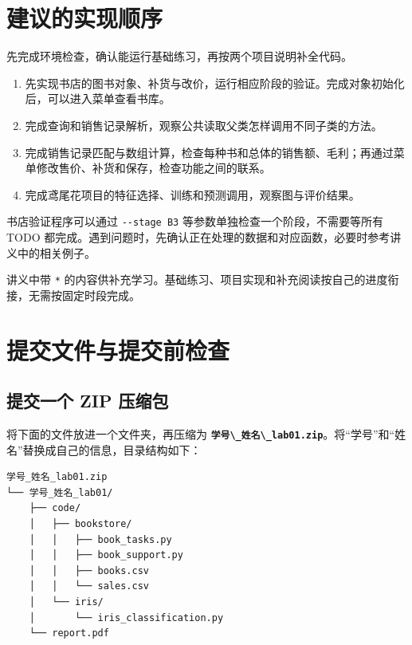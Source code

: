 \documentclass[UTF8,a4paper,11pt,fontset=fandol]{ctexart}
\providecommand{\tightlist}{\setlength{\itemsep}{0pt}\setlength{\parskip}{0pt}}
\providecommand{\passthrough}[1]{#1}
\begin{document}
\section{建议的实现顺序}\label{ux5efaux8baeux7684ux5b9eux73b0ux987aux5e8f}

先完成环境检查，确认能运行基础练习，再按两个项目说明补全代码。

\begin{enumerate}
\def\labelenumi{\arabic{enumi}.}
\tightlist
\item
  先实现书店的图书对象、补货与改价，运行相应阶段的验证。完成对象初始化后，可以进入菜单查看书库。
\item
  完成查询和销售记录解析，观察公共读取父类怎样调用不同子类的方法。
\item
  完成销售记录匹配与数组计算，检查每种书和总体的销售额、毛利；再通过菜单修改售价、补货和保存，检查功能之间的联系。
\item
  完成鸢尾花项目的特征选择、训练和预测调用，观察图与评价结果。
\end{enumerate}

书店验证程序可以通过 \passthrough{\lstinline!--stage B3!} 等参数单独检查一个阶段，不需要等所有 TODO 都完成。遇到问题时，先确认正在处理的数据和对应函数，必要时参考讲义中的相关例子。

讲义中带 \passthrough{\lstinline!*!} 的内容供补充学习。基础练习、项目实现和补充阅读按自己的进度衔接，无需按固定时段完成。

\clearpage

\section{提交文件与提交前检查}\label{ux63d0ux4ea4ux6587ux4ef6ux4e0eux63d0ux4ea4ux524dux68c0ux67e5}

\subsection{提交一个 ZIP 压缩包}\label{ux63d0ux4ea4ux4e00ux4e2a-zip-ux538bux7f29ux5305}

将下面的文件放进一个文件夹，再压缩为 \textbf{\passthrough{\lstinline!学号\_姓名\_lab01.zip!}}。将``学号''和``姓名''替换成自己的信息，目录结构如下：

\begin{lstlisting}[language={}]
学号_姓名_lab01.zip
└── 学号_姓名_lab01/
    ├── code/
    │   ├── bookstore/
    │   │   ├── book_tasks.py
    │   │   ├── book_support.py
    │   │   ├── books.csv
    │   │   └── sales.csv
    │   └── iris/
    │       └── iris_classification.py
    └── report.pdf
\end{lstlisting}
\end{document}
